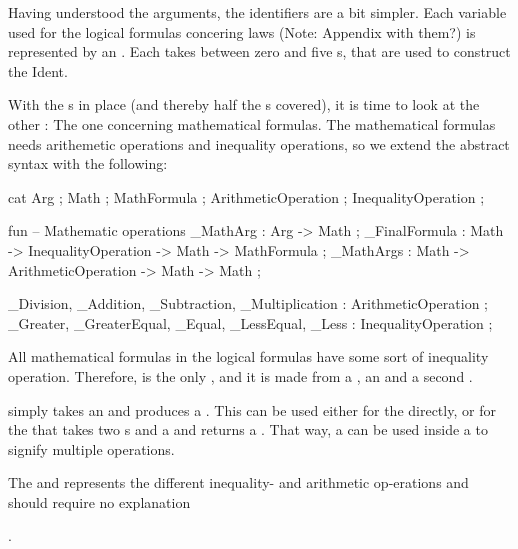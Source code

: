 Having understood the arguments, the identifiers are a bit simpler. Each variable used for the logical formulas concering laws (Note: Appendix with them?) is represented by an . Each  takes between zero and five s, that are used to construct the Ident.

With the s in place (and thereby half the s covered),  it is time to look at the other : The one concerning mathematical formulas. The mathematical formulas needs arithemetic operations and inequality operations, so we extend the abstract syntax with the following:

\begin{lstgf}
    cat
        Arg ; Math ; MathFormula ; ArithmeticOperation ; InequalityOperation ;

    fun
        -- Mathematic operations
        _MathArg : Arg -> Math ;
        _FinalFormula : Math -> InequalityOperation -> Math -> MathFormula ;
        _MathArgs : Math -> ArithmeticOperation -> Math -> Math ;

        _Division, _Addition, _Subtraction, _Multiplication : ArithmeticOperation ;
        _Greater, _GreaterEqual, _Equal, _LessEqual, _Less : InequalityOperation ;
\end{lstgf}

All mathematical formulas in the logical formulas have some sort of inequality operation. Therefore,  is the only , and it is made from a , an  and a second .

 simply takes an  and produces a . This can be used either for the  directly, or for the  that takes two s and a  and returns a . That way, a  can be used inside a  to signify multiple operations.

The  and  represents the different inequality- and arithmetic op-erations and should require no explanation

.